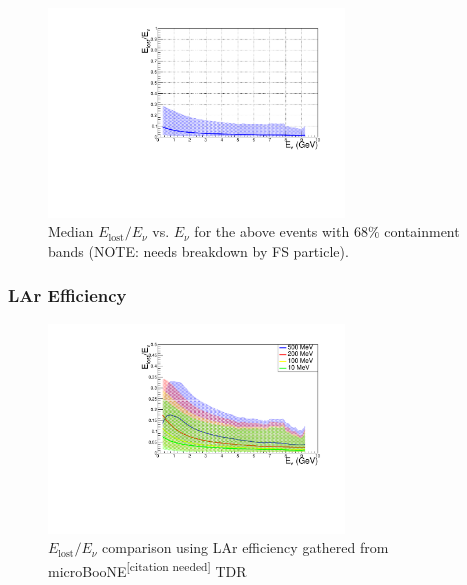 \documentclass{article}
\begin{document}
\begin{figure}[!h]
  \begin{center}
    \includegraphics[width=0.7\textwidth]{plots.old/fig23.pdf}
    \caption{Median $E_{\mathrm{lost}}/E_\nu$ vs. $E_\nu$ for the above events with $68\%$ containment bands (NOTE: needs breakdown by FS particle).}
  \end{center}
\end{figure}

\subsubsection{LAr Efficiency}

\begin{figure}
  \begin{center}
    \includegraphics[width=0.7\textwidth]{plots.old/fig24.pdf}
    \caption{$E_{\mathrm{lost}}/E_\nu$ comparison using LAr efficiency gathered from microBooNE\textsuperscript{[citation needed]} TDR}
  \end{center}
\end{figure}

\end{document}
